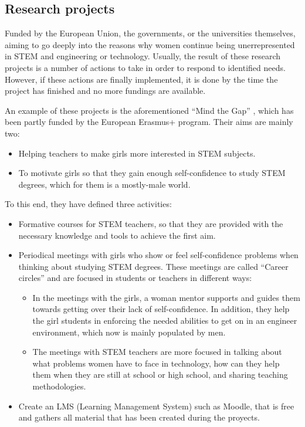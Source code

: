 \documentclass[journal,transmag]{IEEEtran}
\begin{document}
\subsection{Research projects}

Funded by the European Union, the governments, or the universities themselves, aiming to go deeply into the reasons why women continue being unerrepresented in STEM and engineering or technology. Usually, the result of these research projects is a number of actions to take in order to respond to identified needs. However, if these actions are finally implemented, it is done by the time the project has finished and no more fundings are available.

An example of these projects is the aforementioned ``Mind the Gap'' \cite{mtg:site}, which has been partly funded by the European Erasmus+ program. Their aims are mainly two:

\begin{itemize}
  \item Helping teachers to make girls more interested in STEM subjects.
  \item To motivate girls so that they gain enough self-confidence to study STEM degrees, which for them is a mostly-male world.
\end{itemize}

To this end, they have defined three activities:

\begin{itemize}
  \item Formative courses for STEM teachers, so that they are provided with the necessary knowledge and tools to achieve the first aim.
  \item Periodical meetings with girls who show or feel self-confidence problems when thinking about studying STEM degrees. These meetings are called ``Career circles'' and are focused in students or teachers in different ways:
  \begin{itemize}
    \item In the meetings with the girls, a woman mentor supports and guides them towards getting over their lack of self-confidence. In addition, they help the girl students in enforcing the needed abilities to get on in an engineer environment, which now is mainly populated by men.
    \item The meetings with STEM teachers are more focused in talking about what problems women have to face in technology, how can they help them when they are still at school or high school, and sharing teaching methodologies.
  \end{itemize}
  \item Create an LMS (Learning Management System) such as Moodle, that is free and gathers all material that has been created during the proyects.
\end{itemize}
\end{document}
